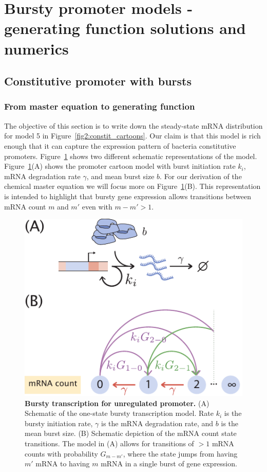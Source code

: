 \section{Bursty promoter models - generating function solutions and numerics}
\label{sec:gen_fcn_appdx}

\subsection{Constitutive promoter with bursts}

\subsubsection{From master equation to generating function}

The objective of this section is to write down the steady-state mRNA
distribution for model 5 in Figure~\ref{fig2:constit_cartoons}. Our claim is
that this model is rich enough that it can capture the expression pattern of
bacteria constitutive promoters. Figure~\ref{figS1:bursty_one_state} shows two
different schematic representations of the model.
Figure~\ref{figS1:bursty_one_state}(A) shows the promoter cartoon model with
burst initiation rate $k_i$, mRNA degradation rate $\gamma$, and mean burst size
$b$. For our derivation of the chemical master equation we will focus more on
Figure~\ref{figS1:bursty_one_state}(B). This representation is intended to
highlight that bursty gene expression allows transitions between mRNA count $m$
and $m'$ even with $m - m' > 1$.

\begin{figure}[h!]
\centering
\includegraphics{../figures/si/figS0X_bursty_states.pdf}
\caption{
\textbf{Bursty transcription for unregulated promoter.}
(A) Schematic of the one-state bursty transcription model. Rate $k_i$ is the
bursty initiation rate, $\gamma$ is the mRNA degradation rate, and $b$ is the
mean burst size. (B) Schematic depiction of the mRNA count state transitions.
The model in (A) allows for transitions of $> 1$ mRNA counts with probability
$G_{m-m'}$, where the state jumps from having $m'$ mRNA to having $m$ mRNA in a
single burst of gene expression.}
\label{figS1:bursty_one_state}
\end{figure}

